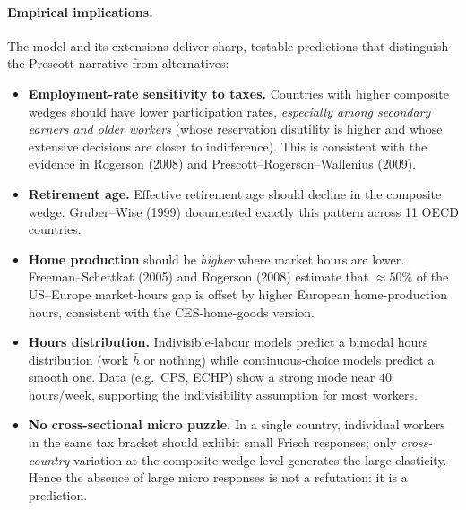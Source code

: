 \documentclass[11pt,a4paper]{article}
\begin{document}
\paragraph{Empirical implications.}
The model and its extensions deliver sharp, testable predictions that distinguish the Prescott narrative from alternatives:
\begin{itemize}[leftmargin=*,itemsep=2pt]
    \item \textbf{Employment-rate sensitivity to taxes.} Countries with higher composite wedges should have lower participation rates, \emph{especially among secondary earners and older workers} (whose reservation disutility is higher and whose extensive decisions are closer to indifference). This is consistent with the evidence in Rogerson (2008) and Prescott--Rogerson--Wallenius (2009).
    \item \textbf{Retirement age.} Effective retirement age should decline in the composite wedge. Gruber--Wise (1999) documented exactly this pattern across 11 OECD countries.
    \item \textbf{Home production} should be \emph{higher} where market hours are lower. Freeman--Schettkat (2005) and Rogerson (2008) estimate that $\approx 50\%$ of the US--Europe market-hours gap is offset by higher European home-production hours, consistent with the CES-home-goods version.
    \item \textbf{Hours distribution.} Indivisible-labour models predict a bimodal hours distribution (work $\bar h$ or nothing) while continuous-choice models predict a smooth one. Data (e.g.\ CPS, ECHP) show a strong mode near $40$ hours/week, supporting the indivisibility assumption for most workers.
    \item \textbf{No cross-sectional micro puzzle.} In a single country, individual workers in the same tax bracket should exhibit small Frisch responses; only \emph{cross-country} variation at the composite wedge level generates the large elasticity. Hence the absence of large micro responses is not a refutation: it is a prediction.
\end{itemize}
\end{document}
